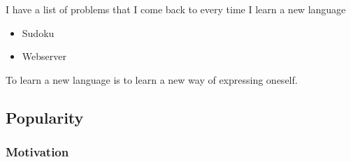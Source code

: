 {\begin{frame}
    \vspace{5mm}
    I have a list of problems that I come back to every time I learn a new language
    \begin{itemize}
      \item Sudoku
      \item Webserver
    \end{itemize}
    
    \vspace{5mm}
    To learn a new language is to learn a new way of expressing oneself.
\end{frame}

\subsection{Popularity}
\begin{frame}
    \frametitle{Motivation }
    \vspace{12mm}
    \begin{center}
    \end{center}
\end{frame}

}


